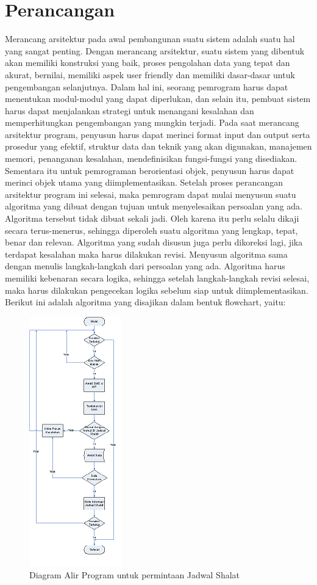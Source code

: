 \documentclass{jtetiproposalskripsi}
\begin{document}
\section{Perancangan}
Merancang arsitektur pada awal pembangunan suatu sistem adalah suatu hal yang sangat penting. Dengan merancang arsitektur, suatu sistem yang dibentuk akan memiliki konstruksi yang baik, proses pengolahan data yang tepat dan akurat, bernilai, memiliki aspek user friendly dan memiliki dasar-dasar untuk pengembangan selanjutnya. Dalam hal ini, seorang pemrogram harus dapat menentukan modul-modul yang dapat diperlukan, dan selain itu, pembuat sistem harus dapat menjalankan strategi  untuk menangani kesalahan dan memperhitungkan pengembangan yang mungkin terjadi.
Pada saat merancang arsitektur program, penyusun harus dapat merinci format input dan output serta prosedur yang efektif, struktur data dan teknik yang akan digunakan, manajemen memori, penanganan kesalahan, mendefinisikan fungsi-fungsi yang disediakan. Sementara itu untuk pemrograman berorientasi objek, penyusun harus dapat merinci objek utama yang diimplementasikan.  
Setelah proses perancangan arsitektur program ini selesai, maka pemrogram dapat mulai menyusun suatu algoritma yang dibuat dengan tujuan untuk menyelesaikan persoalan yang ada.
Algoritma tersebut tidak dibuat sekali jadi. Oleh karena itu perlu selalu dikaji secara terus-menerus, sehingga diperoleh suatu algoritma yang lengkap, tepat, benar dan relevan.
Algoritma yang sudah disusun  juga perlu dikoreksi lagi, jika terdapat kesalahan maka harus dilakukan revisi. Menyusun algoritma  sama dengan menulis langkah-langkah dari persoalan yang ada. Algoritma harus memiliki kebenaran secara logika, sehingga setelah langkah-langkah revisi selesai, maka harus dilakukan pengecekan logika sebelum siap untuk diimplementasikan. Berikut ini adalah algoritma yang disajikan dalam bentuk flowchart, yaitu:

\begin{figure}[ht!]
  \centering
    \includegraphics{gambar/gambar3}
    \caption{Diagram Alir Program untuk permintaan Jadwal Shalat}
    \label{flowchart}
\end{figure}
\end{document}
